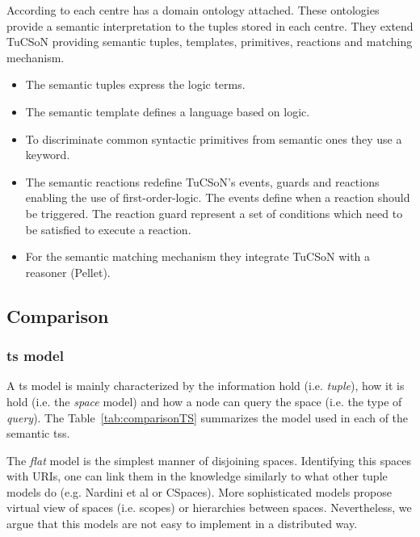 According to \citeauthor{nardini_semantic_2013} each centre has a domain ontology attached.
These ontologies provide a semantic interpretation to the tuples stored in each centre.
They extend TuCSoN providing semantic tuples, templates, primitives, reactions and matching mechanism.
\begin{itemize}
  \item The semantic tuples express the logic terms.
  \item The semantic template defines a language based on logic.
  \item To discriminate common syntactic primitives from semantic ones they use a keyword.
  \item The semantic reactions redefine TuCSoN's events, guards and reactions enabling the use of first-order-logic.
	The events define when a reaction should be triggered.
	The reaction guard represent a set of conditions which need to be satisfied to execute a reaction.
  \item For the semantic matching mechanism they integrate TuCSoN with a reasoner (Pellet). %
\end{itemize}



\subsection{Comparison}


\subsubsection{\acl{ts} model}

A \acl{ts} model is mainly characterized by the information hold (i.e. \emph{tuple}),
how it is hold (i.e. the \emph{space} model)
and how a node can query the space (i.e. the type of \emph{query}).
The Table~\ref{tab:comparisonTS} summarizes the model used in each of the semantic \aclp{ts}.

The \emph{flat} model is the simplest manner of disjoining spaces.
Identifying this spaces with URIs, one can link them in the knowledge similarly to what other tuple models do (e.g. Nardini et al or CSpaces). %
More sophisticated models propose virtual view of spaces (i.e. scopes) or hierarchies between spaces.
Nevertheless, we argue that this models are not easy to implement in a distributed way. %


